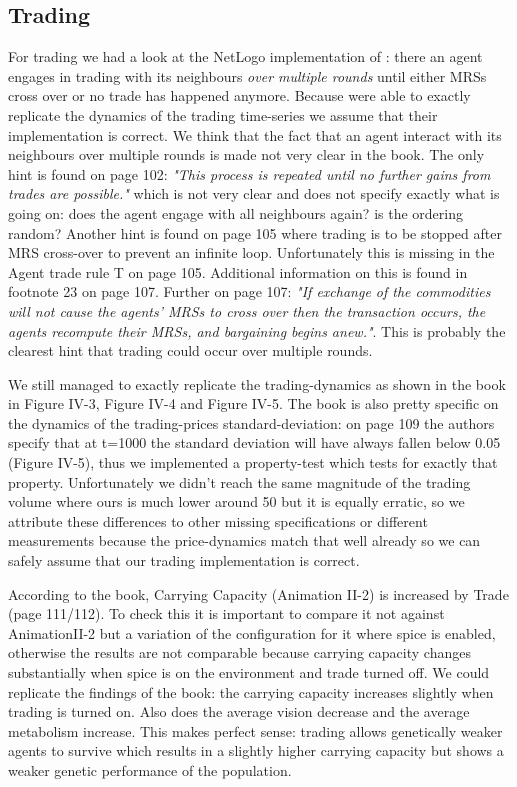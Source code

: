 \subsection{Trading}
For trading we had a look at the NetLogo implementation of \cite{weaver_replicating_2009}: there an agent engages in trading with its neighbours \textit{over multiple rounds} until either MRSs cross over or no trade has happened anymore. Because \cite{weaver_replicating_2009} were able to exactly replicate the dynamics of the trading time-series we assume that their implementation is correct. We think that the fact that an agent interact with its neighbours over multiple rounds is made not very clear in the book. The only hint is found on page 102: \textit{"This process is repeated until no further gains from trades are possible."} which is not very clear and does not specify exactly what is going on: does the agent engage with all neighbours again? is the ordering random? Another hint is found on page 105 where trading is to be stopped after MRS cross-over to prevent an infinite loop. Unfortunately this is missing in the Agent trade rule T on page 105. Additional information on this is found in footnote 23 on page 107. Further on page 107: \textit{"If exchange of the commodities will not cause the agents' MRSs to cross over then the transaction occurs, the agents recompute their MRSs, and bargaining begins anew."}. This is probably the clearest hint that trading could occur over multiple rounds.

We still managed to exactly replicate the trading-dynamics as shown in the book in Figure IV-3, Figure IV-4 and Figure IV-5. The book is also pretty specific on the dynamics of the trading-prices standard-deviation: on page 109 the authors specify that at t=1000 the standard deviation will have always fallen below 0.05 (Figure IV-5), thus we implemented a property-test which tests for exactly that property. Unfortunately we didn't reach the same magnitude of the trading volume where ours is much lower around 50 but it is equally erratic, so we attribute these differences to other missing specifications or different measurements because the price-dynamics match that well already so we can safely assume that our trading implementation is correct.

According to the book, Carrying Capacity (Animation II-2) is increased by Trade (page 111/112). To check this it is important to compare it not against AnimationII-2 but a variation of the configuration for it where spice is enabled, otherwise the results are not comparable because carrying capacity changes substantially when spice is on the environment and trade turned off. We could replicate the findings of the book: the carrying capacity increases slightly when trading is turned on. Also does the average vision decrease and the average metabolism increase. This makes perfect sense: trading allows genetically weaker agents to survive which results in a slightly higher carrying capacity but shows a weaker genetic performance of the population.

